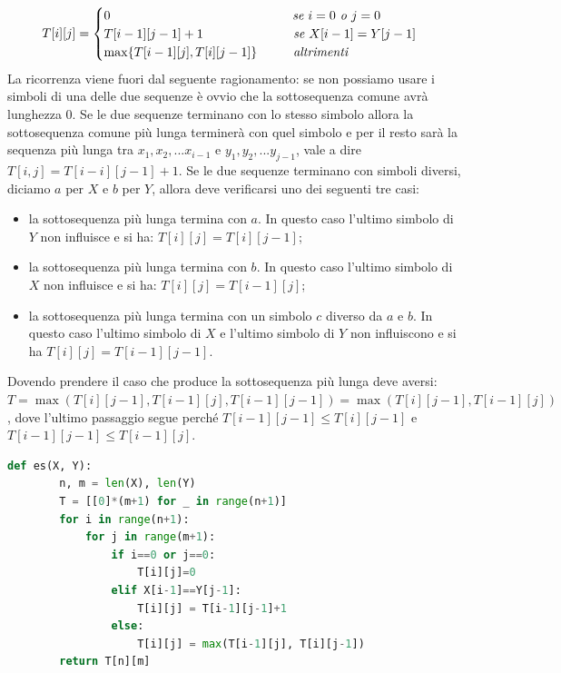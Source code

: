 \begin{equation*}T[i][j]=
\begin{cases}
    0\hspace{5.05cm}\textit{se }i=0\textit{ o }j=0\\
    T[i-1][j-1]+1\hspace{2.5cm}\textit{se }X[i-1]=Y[j-1]\\
    \max\{T[i-1][j],T[i][j-1]\}\hspace{1cm}\textit{altrimenti}
\end{cases}
\end{equation*}
La ricorrenza viene fuori dal seguente ragionamento: se non possiamo usare i simboli di una delle due sequenze è ovvio che la sottosequenza comune avrà lunghezza 0. Se le due sequenze terminano con lo stesso simbolo allora la sottosequenza comune più lunga terminerà con quel simbolo e per il resto sarà la sequenza più lunga tra $x_1, x_2, ... x_{i-1}$ e $y_1, y_2, ... y_{j-1}$, vale a dire $T[i, j] = T[i-i][j-1] + 1$. Se le due sequenze terminano con simboli diversi, diciamo $a$ per $X$ e $b$ per $Y$, allora deve verificarsi uno dei seguenti tre casi: 
\begin{itemize}
    \item la sottosequenza più lunga termina con $a$. In questo caso l'ultimo simbolo di $Y$ non influisce e si ha: $T[i][j] = T[i][j-1]$;
    \item la sottosequenza più lunga termina con $b$. In questo caso l'ultimo simbolo di $X$ non influisce e si ha: $T[i][j]=T[i-1][j]$;
    \item la sottosequenza più lunga termina con un simbolo $c$ diverso da $a$ e $b$. In questo caso l'ultimo simbolo di $X$ e l'ultimo simbolo di $Y$ non influiscono e si ha $T[i][j] = T[i - 1][j - 1]$.
\end{itemize}
Dovendo prendere il caso che produce la sottosequenza più lunga deve aversi: $T=\max(T[i][j-1], T[i-1][j], T[i-1][j-1])=\max(T[i][j - 1], T[i-1][j])$, dove l'ultimo passaggio segue perché $T[i-1][j-1] \leq T[i][j-1]$ e $T[i-1][j-1]\leq T[i-1][j]$.

\begin{lstlisting}[language=Python]
    def es(X, Y):
        n, m = len(X), len(Y)
        T = [[0]*(m+1) for _ in range(n+1)]
        for i in range(n+1):
            for j in range(m+1):
                if i==0 or j==0:
                    T[i][j]=0
                elif X[i-1]==Y[j-1]:
                    T[i][j] = T[i-1][j-1]+1
                else:
                    T[i][j] = max(T[i-1][j], T[i][j-1])
        return T[n][m]
\end{lstlisting}


